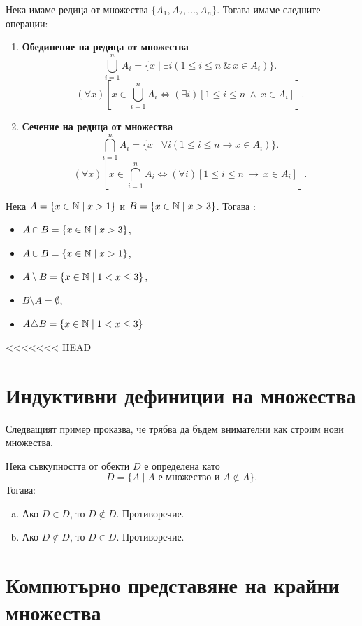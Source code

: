   Нека имаме редица от множества $\{A_1,A_2,\dots,A_n\}$.
  Тогава имаме следните операции:
  \begin{enumerate}[{\bf (I)}]
  \item
    {\bf Обединение на редица от множества}
    \[\bigcup^{n}_{i=1} A_i = \{x \mid \exists i (1\leq i\leq n\ \&\ x\in A_i)\}.\]
    \[(\forall x)[x \in \bigcup^n_{i=1}A_i \iff (\exists i)[1 \leq i \leq n\ \wedge\ x \in A_i]].\]
  \item
    {\bf Сечение на редица от множества}
    \[\bigcap^{n}_{i=1} A_i = \{x \mid \forall i (1\leq i\leq n \rightarrow x\in A_i)\}.\]
    \[(\forall x)[x \in \bigcap^n_{i=1}A_i \iff (\forall i)[1 \leq i \leq n\ \rightarrow\ x \in A_i]].\]
  \end{enumerate}

\begin{example}
  Нека $A = \{x\in\mathbb{N}\mid x > 1\}$ и $B = \{x\in\mathbb{N}\mid x>3\}$. Тогава :
  \begin{itemize}
    \item
      $A\cap B = \{x\in\mathbb{N}\mid x > 3\}$,
    \item
      $A\cup B = \{x\in\mathbb{N}\mid x > 1\}$,
    \item
      $A\setminus B = \{x\in\mathbb{N}\mid 1<x\leq 3\}$,
    \item
      $B\setminus A = \emptyset$,
    \item
      $A\triangle B = \{x\in\mathbb{N}\mid 1<x\leq 3\}$
    \end{itemize}
\end{example}

<<<<<<< HEAD
\section*{Индуктивни дефиниции на множества}

Следващият пример проказва, че трябва да бъдем внимателни как строим нови множества.
\begin{example}
  Нека съвкупността от обекти $D$ е определена като
  \[D = \{A\mid A\mbox{ е множество и } A\not\in A\}.\]
  Тогава:
  \begin{enumerate}[a)]
  \item
    Ако $D \in D$, то $D \not\in D$. Противоречие.
  \item
    Ако $D \not\in D$, то $D \in D$. Противоречие.
  \end{enumerate}
\end{example}

\section*{Компютърно представяне на крайни множества}




